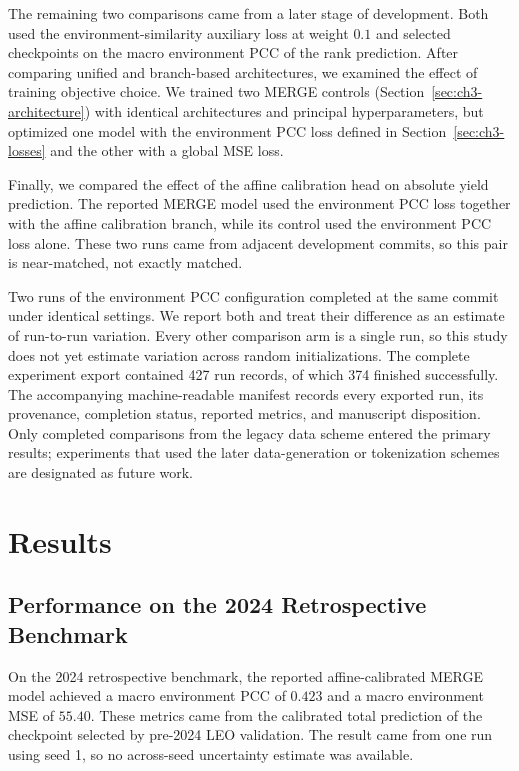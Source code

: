 The remaining two comparisons came from a later stage of development. Both used the environment-similarity auxiliary loss at weight $0.1$ and selected checkpoints on the macro environment PCC of the rank prediction. After comparing unified and branch-based architectures, we examined the effect of training objective choice. We trained two MERGE controls (Section~\ref{sec:ch3-architecture}) with identical architectures and principal hyperparameters, but optimized one model with the environment PCC loss defined in Section~\ref{sec:ch3-losses} and the other with a global MSE loss.

Finally, we compared the effect of the affine calibration head on absolute yield prediction. The reported MERGE model used the environment PCC loss together with the affine calibration branch, while its control used the environment PCC loss alone. These two runs came from adjacent development commits, so this pair is near-matched, not exactly matched.

Two runs of the environment PCC configuration completed at the same commit under identical settings. We report both and treat their difference as an estimate of run-to-run variation. Every other comparison arm is a single run, so this study does not yet estimate variation across random initializations. The complete experiment export contained 427 run records, of which 374 finished successfully. The accompanying machine-readable manifest records every exported run, its provenance, completion status, reported metrics, and manuscript disposition. Only completed comparisons from the legacy data scheme entered the primary results; experiments that used the later data-generation or tokenization schemes are designated as future work.

\section{Results}

\subsection{Performance on the 2024 Retrospective Benchmark}
On the 2024 retrospective benchmark, the reported affine-calibrated MERGE model achieved a macro environment PCC of $0.423$ and a macro environment MSE of $55.40$. These metrics came from the calibrated total prediction of the checkpoint selected by pre-2024 LEO validation. The result came from one run using seed 1, so no across-seed uncertainty estimate was available.

